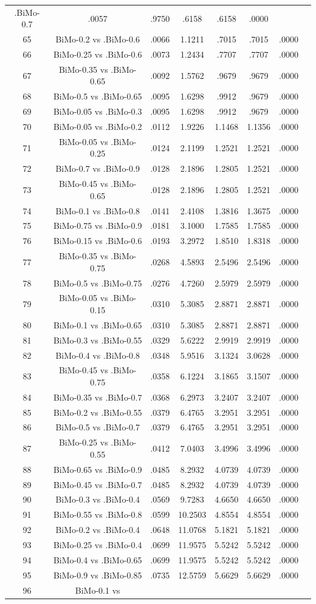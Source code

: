 \documentclass[a4paper,10pt]{article}
\begin{document}
\begin{landscape}
\begin{table}[!htp]
\begin{tabular}{cccccccc}
.BiMo-0.7&.0057&.9750&.6158&.6158&.0000\\65&BiMo-0.2 vs .BiMo-0.6&.0066&1.1211&.7015&.7015&.0000\\66&BiMo-0.25 vs .BiMo-0.6&.0073&1.2434&.7707&.7707&.0000\\67&BiMo-0.35 vs .BiMo-0.65&.0092&1.5762&.9679&.9679&.0000\\68&BiMo-0.5 vs .BiMo-0.65&.0095&1.6298&.9912&.9679&.0000\\69&BiMo-0.05 vs .BiMo-0.3&.0095&1.6298&.9912&.9679&.0000\\70&BiMo-0.05 vs .BiMo-0.2&.0112&1.9226&1.1468&1.1356&.0000\\71&BiMo-0.05 vs .BiMo-0.25&.0124&2.1199&1.2521&1.2521&.0000\\72&BiMo-0.7 vs .BiMo-0.9&.0128&2.1896&1.2805&1.2521&.0000\\73&BiMo-0.45 vs .BiMo-0.65&.0128&2.1896&1.2805&1.2521&.0000\\74&BiMo-0.1 vs .BiMo-0.8&.0141&2.4108&1.3816&1.3675&.0000\\75&BiMo-0.75 vs .BiMo-0.9&.0181&3.1000&1.7585&1.7585&.0000\\76&BiMo-0.15 vs .BiMo-0.6&.0193&3.2972&1.8510&1.8318&.0000\\77&BiMo-0.35 vs .BiMo-0.75&.0268&4.5893&2.5496&2.5496&.0000\\78&BiMo-0.5 vs .BiMo-0.75&.0276&4.7260&2.5979&2.5979&.0000\\79&BiMo-0.05 vs .BiMo-0.15&.0310&5.3085&2.8871&2.8871&.0000\\80&BiMo-0.1 vs .BiMo-0.65&.0310&5.3085&2.8871&2.8871&.0000\\81&BiMo-0.3 vs .BiMo-0.55&.0329&5.6222&2.9919&2.9919&.0000\\82&BiMo-0.4 vs .BiMo-0.8&.0348&5.9516&3.1324&3.0628&.0000\\83&BiMo-0.45 vs .BiMo-0.75&.0358&6.1224&3.1865&3.1507&.0000\\84&BiMo-0.35 vs .BiMo-0.7&.0368&6.2973&3.2407&3.2407&.0000\\85&BiMo-0.2 vs .BiMo-0.55&.0379&6.4765&3.2951&3.2951&.0000\\86&BiMo-0.5 vs .BiMo-0.7&.0379&6.4765&3.2951&3.2951&.0000\\87&BiMo-0.25 vs .BiMo-0.55&.0412&7.0403&3.4996&3.4996&.0000\\88&BiMo-0.65 vs .BiMo-0.9&.0485&8.2932&4.0739&4.0739&.0000\\89&BiMo-0.45 vs .BiMo-0.7&.0485&8.2932&4.0739&4.0739&.0000\\90&BiMo-0.3 vs .BiMo-0.4&.0569&9.7283&4.6650&4.6650&.0000\\91&BiMo-0.55 vs .BiMo-0.8&.0599&10.2503&4.8554&4.8554&.0000\\92&BiMo-0.2 vs .BiMo-0.4&.0648&11.0768&5.1821&5.1821&.0000\\93&BiMo-0.25 vs .BiMo-0.4&.0699&11.9575&5.5242&5.5242&.0000\\94&BiMo-0.4 vs .BiMo-0.65&.0699&11.9575&5.5242&5.5242&.0000\\95&BiMo-0.9 vs .BiMo-0.85&.0735&12.5759&5.6629&5.6629&.0000\\96&BiMo-0.1 vs 
\end{tabular}
\end{table}
\end{landscape}
\end{document}
